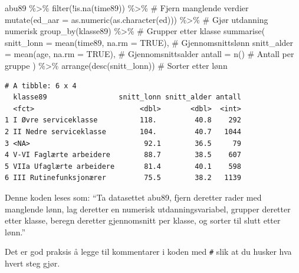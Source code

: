 \documentclass[
  norsk,
  letterpaper,
  DIV=11,
  numbers=noendperiod]{scrreprt}
\newenvironment{Shaded}{\begin{snugshade}}{\end{snugshade}}
\newcommand{\AttributeTok}[1]{\textcolor[rgb]{0.40,0.45,0.13}{#1}}
\newcommand{\CommentTok}[1]{\textcolor[rgb]{0.37,0.37,0.37}{#1}}
\newcommand{\ConstantTok}[1]{\textcolor[rgb]{0.56,0.35,0.01}{#1}}
\newcommand{\FunctionTok}[1]{\textcolor[rgb]{0.28,0.35,0.67}{#1}}
\newcommand{\NormalTok}[1]{\textcolor[rgb]{0.00,0.23,0.31}{#1}}
\newcommand{\SpecialCharTok}[1]{\textcolor[rgb]{0.37,0.37,0.37}{#1}}
\theoremstyle{definition}
\theoremstyle{remark}
\begin{document}
\begin{Shaded}
\begin{Highlighting}[]
\NormalTok{abu89 }\SpecialCharTok{\%\textgreater{}\%}
  \FunctionTok{filter}\NormalTok{(}\SpecialCharTok{!}\FunctionTok{is.na}\NormalTok{(time89)) }\SpecialCharTok{\%\textgreater{}\%}                         \CommentTok{\# Fjern manglende verdier}
  \FunctionTok{mutate}\NormalTok{(}\AttributeTok{ed\_aar =} \FunctionTok{as.numeric}\NormalTok{(}\FunctionTok{as.character}\NormalTok{(ed))) }\SpecialCharTok{\%\textgreater{}\%}   \CommentTok{\# Gjør utdanning numerisk}
  \FunctionTok{group\_by}\NormalTok{(klasse89) }\SpecialCharTok{\%\textgreater{}\%}                              \CommentTok{\# Grupper etter klasse}
  \FunctionTok{summarise}\NormalTok{(}
    \AttributeTok{snitt\_lonn =} \FunctionTok{mean}\NormalTok{(time89, }\AttributeTok{na.rm =} \ConstantTok{TRUE}\NormalTok{),          }\CommentTok{\# Gjennomsnittslønn}
    \AttributeTok{snitt\_alder =} \FunctionTok{mean}\NormalTok{(age, }\AttributeTok{na.rm =} \ConstantTok{TRUE}\NormalTok{),             }\CommentTok{\# Gjennomsnittsalder}
    \AttributeTok{antall =} \FunctionTok{n}\NormalTok{()                                       }\CommentTok{\# Antall per gruppe}
\NormalTok{  ) }\SpecialCharTok{\%\textgreater{}\%}
  \FunctionTok{arrange}\NormalTok{(}\FunctionTok{desc}\NormalTok{(snitt\_lonn))                            }\CommentTok{\# Sorter etter lønn}
\end{Highlighting}
\end{Shaded}

\begin{verbatim}
# A tibble: 6 x 4
  klasse89                 snitt_lonn snitt_alder antall
  <fct>                         <dbl>       <dbl>  <int>
1 I Øvre serviceklasse          118.         40.8    292
2 II Nedre serviceklasse        104.         40.7   1044
3 <NA>                           92.1        36.5     79
4 V-VI Faglærte arbeidere        88.7        38.5    607
5 VIIa Ufaglærte arbeidere       81.4        40.1    598
6 III Rutinefunksjonærer         75.5        38.2   1139
\end{verbatim}

Denne koden leses som: ``Ta datasettet abu89, fjern deretter rader med
manglende lønn, lag deretter en numerisk utdanningsvariabel, grupper
deretter etter klasse, beregn deretter gjennomsnitt per klasse, og
sorter til slutt etter lønn.''

Det er god praksis å legge til kommentarer i koden med \texttt{\#} slik
at du husker hva hvert steg gjør.
\end{document}
